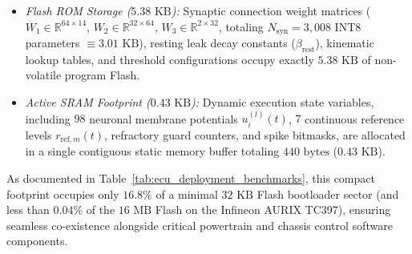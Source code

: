 \documentclass[journal]{IEEEtran}
\begin{document}
\begin{itemize}
    \item \textit{Flash ROM Storage ($5.38\text{ KB}$):} Synaptic connection weight matrices ($W_1 \in \mathbb{R}^{64 \times 14}$, $W_2 \in \mathbb{R}^{32 \times 64}$, $W_3 \in \mathbb{R}^{2 \times 32}$, totaling $N_{\text{syn}} = 3{,}008$ INT8 parameters $\equiv 3.01\text{ KB}$), resting leak decay constants ($\beta_{\text{rest}}$), kinematic lookup tables, and threshold configurations occupy exactly $5.38\text{ KB}$ of non-volatile program Flash.
    \item \textit{Active SRAM Footprint ($0.43\text{ KB}$):} Dynamic execution state variables, including $98$ neuronal membrane potentials $u_i^{(l)}(t)$, $7$ continuous reference levels $r_{\text{ref}, m}(t)$, refractory guard counters, and spike bitmasks, are allocated in a single contiguous static memory buffer totaling $440\text{ bytes}$ ($0.43\text{ KB}$).
\end{itemize}
As documented in Table~\ref{tab:ecu_deployment_benchmarks}, this compact footprint occupies only $16.8\%$ of a minimal $32\text{ KB}$ Flash bootloader sector (and less than $0.04\%$ of the $16\text{ MB}$ Flash on the Infineon AURIX TC397), ensuring seamless co-existence alongside critical powertrain and chassis control software components.

\begin{table}[t]
\caption{Automotive ECU Embedded Deployment, Memory Allocation, and Real-Time Hardware Profiling}
\label{tab:ecu_deployment_benchmarks}
\centering
{}
\end{table}
\end{document}
